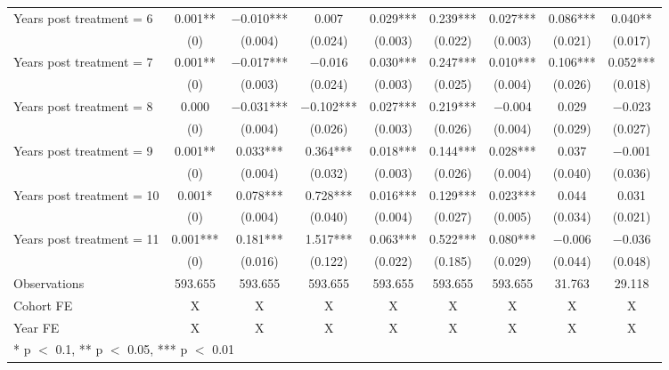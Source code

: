 \begin{table}[H]
{\begin{threeparttable}
\begin{tabular}[t]{lcccccccc}
Years post treatment = 6 & \num{0.001}** & \num{-0.010}*** & \num{ 0.007} & \num{0.029}*** & \num{0.239}*** & \num{ 0.027}*** & \num{ 0.086}*** & \num{ 0.040}**\\
 & (\num{0}) & (\num{0.004}) & (\num{0.024}) & (\num{0.003}) & (\num{0.022}) & (\num{0.003}) & (\num{0.021}) & (\num{0.017})\\
Years post treatment = 7 & \num{0.001}** & \num{-0.017}*** & \num{-0.016} & \num{0.030}*** & \num{0.247}*** & \num{ 0.010}*** & \num{ 0.106}*** & \num{ 0.052}***\\
 & (\num{0}) & (\num{0.003}) & (\num{0.024}) & (\num{0.003}) & (\num{0.025}) & (\num{0.004}) & (\num{0.026}) & (\num{0.018})\\
Years post treatment = 8 & \num{0.000} & \num{-0.031}*** & \num{-0.102}*** & \num{0.027}*** & \num{0.219}*** & \num{-0.004} & \num{ 0.029} & \num{-0.023}\\
 & (\num{0}) & (\num{0.004}) & (\num{0.026}) & (\num{0.003}) & (\num{0.026}) & (\num{0.004}) & (\num{0.029}) & (\num{0.027})\\
Years post treatment = 9 & \num{0.001}** & \num{ 0.033}*** & \num{ 0.364}*** & \num{0.018}*** & \num{0.144}*** & \num{ 0.028}*** & \num{ 0.037} & \num{-0.001}\\
 & (\num{0}) & (\num{0.004}) & (\num{0.032}) & (\num{0.003}) & (\num{0.026}) & (\num{0.004}) & (\num{0.040}) & (\num{0.036})\\
Years post treatment = 10 & \num{0.001}* & \num{ 0.078}*** & \num{ 0.728}*** & \num{0.016}*** & \num{0.129}*** & \num{ 0.023}*** & \num{ 0.044} & \num{ 0.031}\\
 & (\num{0}) & (\num{0.004}) & (\num{0.040}) & (\num{0.004}) & (\num{0.027}) & (\num{0.005}) & (\num{0.034}) & (\num{0.021})\\
Years post treatment = 11 & \num{0.001}*** & \num{ 0.181}*** & \num{ 1.517}*** & \num{0.063}*** & \num{0.522}*** & \num{ 0.080}*** & \num{-0.006} & \num{-0.036}\\
 & (\num{0}) & (\num{0.016}) & (\num{0.122}) & (\num{0.022}) & (\num{0.185}) & (\num{0.029}) & (\num{0.044}) & (\num{0.048})\\
\midrule
Observations & \num{593,655} & \num{593,655} & \num{593,655} & \num{593,655} & \num{593,655} & \num{593,655} & \num{31,763} & \num{29,118}\\
Cohort FE & X & X & X & X & X & X & X & X\\
Year FE & X & X & X & X & X & X & X & X\\
\bottomrule
\multicolumn{9}{l}{\rule{0pt}{1em}* p $<$ 0.1, ** p $<$ 0.05, *** p $<$ 0.01}\\

\end{tabular}
\end{threeparttable}}
\end{table}
